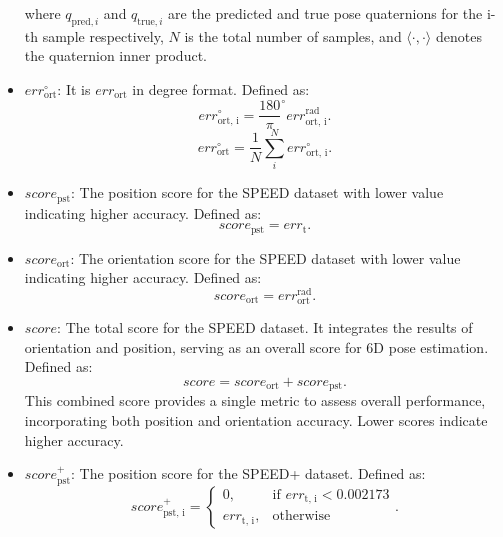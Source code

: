 \documentclass[a4paper,fleqn]{cas-sc}
\begin{document}
\begin{itemize}
	where $q_{\text{pred},i}$ and $q_{\text{true},i}$ are the predicted and true pose quaternions for the i-th sample respectively, $N$ is the total
	number of samples, and $\langle \cdot, \cdot \rangle$ denotes the quaternion inner product.
	
	\item $err_{\text{ort}}^{\circ}$: It is $err_{\text{ort}}$ in degree format. Defined as:
	\begin{equation}
		err_{\text{ort, i}}^{\circ} =  \frac{180}{\pi}^{\circ} err_{\text{ort, i}}^{\text{rad}}.
	\end{equation}
	\begin{equation}
		err_{\text{ort}}^{\circ} = \frac{1}{N}\sum\limits_i^N err_{\text{ort, i}}^{\circ}. 
	\end{equation}
	
	\item $score_{\text{pst}}$: The position score for the SPEED dataset with lower value indicating higher accuracy. Defined as:
	\begin{equation}
		score_{\text{pst}} = err_{\text{t}}.
	\end{equation}
	
	\item $score_{\text{ort}}$: The orientation score for the SPEED dataset with lower value indicating higher accuracy. Defined as:
	\begin{equation}
		score_{\text{ort}} = err_{\text{ort}}^{\text{rad}}.
	\end{equation}
	
	\item $score$: The total score for the SPEED dataset. It integrates the results of orientation and position, serving as an overall score for 6D pose estimation. Defined as:
	\begin{equation}
		score = score_{\text{ort}} + score_{\text{pst}}.
	\end{equation}
	This combined score provides a single metric to assess overall performance, incorporating both position and orientation accuracy. Lower scores indicate higher accuracy.
	
	\item $score_{\text{pst}}^+$: The position score for the SPEED+ dataset. Defined as:
	\begin{equation}
		score_{\text{pst, i}}^+ = 
		\begin{cases}
			0, & \text{if } err_{\text{t, i}} < 0.002173 \\
			err_{\text{t, i}}, & \text{otherwise}
		\end{cases}.
	\end{equation}
	

\end{itemize}
\end{document}
